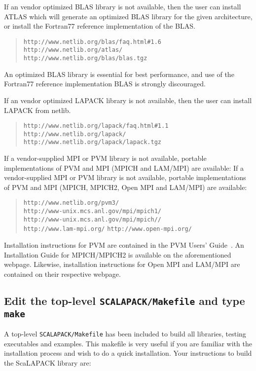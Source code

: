 \documentclass[11pt]{report}
\begin{document}
If an vendor optimized BLAS library is not available, then the user can
install ATLAS which will generate an optimized BLAS library for the given
architecture, or install the Fortran77 reference implementation of the BLAS.
\begin{quote}
{\tt http://www.netlib.org/blas/faq.html\#1.6} \\
{\tt http://www.netlib.org/atlas/} \\
{\tt http://www.netlib.org/blas/blas.tgz}
\end{quote}
An optimized BLAS library is essential for best performance, and
use of the Fortran77 reference implementation BLAS is strongly
discouraged.

If an vendor optimized LAPACK library is not available, then the user can
install LAPACK from netlib.
\begin{quote}
{\tt http://www.netlib.org/lapack/faq.html\#1.1} \\
{\tt http://www.netlib.org/lapack/} \\
{\tt http://www.netlib.org/lapack/lapack.tgz}
\end{quote}

If a vendor-supplied MPI or PVM library is not available,
portable implementations of PVM and MPI (MPICH and LAM/MPI)
are available:
If a vendor-supplied MPI or PVM library is not available,
portable implementations of PVM and MPI (MPICH, MPICH2, Open MPI and LAM/MPI)
are available:
\begin{quote}
{\tt http://www.netlib.org/pvm3/}\\
{\tt http://www-unix.mcs.anl.gov/mpi/mpich1/} \\
{\tt http://www-unix.mcs.anl.gov/mpi/mpich//} \\
{\tt http://www.lam-mpi.org/}
{\tt http://www.open-mpi.org/}
\end{quote}
Installation instructions for PVM are contained in the PVM Users'
Guide~\cite{pvm}.  An Installation Guide for MPICH/MPICH2 is available on
the aforementioned webpage.  Likewise, installation instructions
for Open MPI and LAM/MPI are contained on their respective webpage.

\subsection{Edit the top-level {\tt SCALAPACK/Makefile} and type {\tt make}}

A top-level {\tt SCALAPACK/Makefile} has been included to build all
libraries, testing executables and examples.  This makefile is very useful if you
are familiar with the installation process and wish to do a quick
installation.  Your instructions to build the ScaLAPACK library are:
\end{document}
